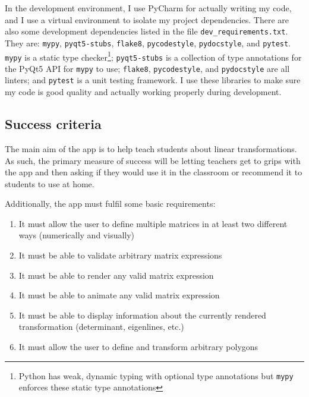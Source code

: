 \documentclass[../main.tex]{subfiles}
\begin{document}
In the development environment, I use PyCharm for actually writing my code, and I use a virtual environment to isolate my project dependencies. There are also some development dependencies listed in the file \texttt{dev\_requirements.txt}. They are: \texttt{mypy}, \texttt{pyqt5-stubs}, \texttt{flake8}, \texttt{pycodestyle}, \texttt{pydocstyle}, and \texttt{pytest}. \texttt{mypy} is a static type checker\footnote{Python has weak, dynamic typing with optional type annotations but \texttt{mypy} enforces these static type annotations}; \texttt{pyqt5-stubs} is a collection of type annotations for the PyQt5 API for \texttt{mypy} to use; \texttt{flake8}, \texttt{pycodestyle}, and \texttt{pydocstyle} are all linters; and \texttt{pytest} is a unit testing framework. I use these libraries to make sure my code is good quality and actually working properly during development.

\subsection{Success criteria\label{subsection:success-criteria}}

The main aim of the app is to help teach students about linear transformations. As such, the primary measure of success will be letting teachers get to grips with the app and then asking if they would use it in the classroom or recommend it to students to use at home.

Additionally, the app must fulfil some basic requirements:
\vspace{-0.3cm}
\begin{enumerate}
	\item\label{success-criterion:define-multiple-matrices} It must allow the user to define multiple matrices in at least two different ways (numerically and visually)
	\item\label{success-criterion:validate-arbitrary-matrix-expressions} It must be able to validate arbitrary matrix expressions
	\item\label{success-criterion:render-any-valid-expression} It must be able to render any valid matrix expression
	\item\label{success-criterion:animate-any-valid-expression} It must be able to animate any valid matrix expression
	\item\label{success-criterion:display-matrix-info} It must be able to display information about the currently rendered transformation (determinant, eigenlines, etc.)
	\item\label{success-criterion:transform-polygons} It must allow the user to define and transform arbitrary polygons
\end{enumerate}
\end{document}
